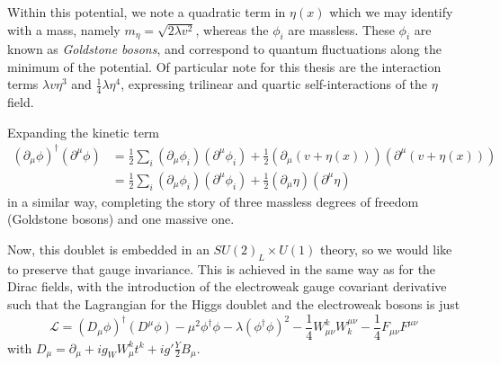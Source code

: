 Within this potential, we note a quadratic term in $\eta(x)$ which we may identify with a mass, namely
$m_{\eta} = \sqrt{2\lambda v^2}$, whereas the $\phi_{i}$ are massless. These $\phi_{i}$ are known as 
\emph{Goldstone bosons}, and correspond to quantum fluctuations along the minimum of the potential.
Of particular note for this thesis are the interaction terms $\lambda v \eta^3$ and $\frac{1}{4}\lambda\eta^4$,
expressing trilinear and quartic self-interactions of the $\eta$ field.

Expanding the kinetic term
\begin{align}
(\partial_{\mu}\phi)^{\dagger}(\partial^{\mu}\phi) &= \frac{1}{2}\sum\limits_{i}(\partial_{\mu}\phi_i)(\partial^{\mu}\phi_i) + \frac{1}{2}(\partial_{\mu}(v+\eta(x)))(\partial^{\mu}(v+\eta(x)))\\
&= \frac{1}{2}\sum\limits_{i}(\partial_{\mu}\phi_i)(\partial^{\mu}\phi_i) + \frac{1}{2}(\partial_{\mu}\eta)(\partial^{\mu}\eta)
\end{align}
in a similar way, completing the story of three massless degrees of freedom (Goldstone bosons) and one massive one.


Now, this doublet is embedded in an $SU(2)_{L} \times U(1)$ theory, so we would like to preserve that gauge 
invariance. This is achieved in the same way as for the Dirac fields, with the introduction of the electroweak 
gauge covariant derivative such that the Lagrangian for the Higgs doublet and the electroweak bosons is just
\begin{equation}
\mathcal{L} = (D_{\mu}\phi)^{\dagger}(D^{\mu}\phi) -\mu^2\phi^{\dagger}\phi - \lambda(\phi^{\dagger}\phi)^2 -\frac{1}{4} W_{\mu\nu}^{k}W^{\mu\nu}_{k} - \frac{1}{4}F_{\mu\nu}F^{\mu\nu}
\end{equation}
with $D_{\mu} = \partial_{\mu} + ig_{W}W_{\mu}^{k}t^{k} + ig'\frac{Y}{2}B_{\mu}$.


